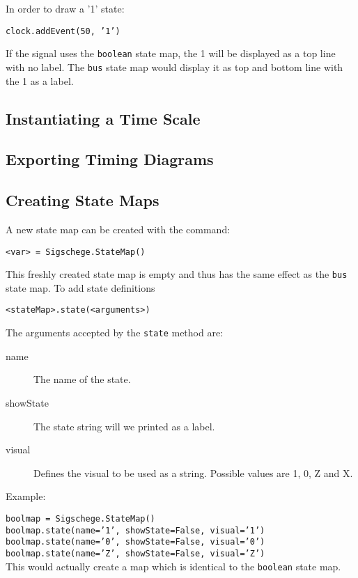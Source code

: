 \documentclass[11pt]{article}
\begin{document}
In order to draw a '1' state:

\texttt{clock.addEvent(50, '1')}

If the signal uses the \texttt{boolean} state map, the 1 will be displayed as a
top line with no label. The \texttt{bus} state map would display it as top and
bottom line with the 1 as a label.


\subsection{Instantiating a Time Scale}
\label{sec:tis}



\subsection{Exporting Timing Diagrams}
\label{sec:exp}

\subsection{Creating State Maps}
\label{sec:tis}

A new state map can be created with the command:

\begin{center}
  \texttt{<var> = Sigschege.StateMap()}
\end{center}

This freshly created state map is empty and thus has the same effect as the
\texttt{bus} state map. To add state definitions

\begin{center}
  \texttt{<stateMap>.state(<arguments>)}
\end{center}

The arguments accepted by the \texttt{state} method are:

\begin{description}
\item[name] The name of the state.
\item[showState] The state string will we printed as a label.
\item[visual] Defines the visual to be used as a string. Possible values are 1, 0, Z and X.
\end{description}

Example:

\texttt{boolmap = Sigschege.StateMap()}\\
\texttt{boolmap.state(name='1', showState=False, visual='1')}\\
\texttt{boolmap.state(name='0', showState=False, visual='0')}\\
\texttt{boolmap.state(name='Z', showState=False, visual='Z')}\\

This would actually create a map which is identical to the \texttt{boolean}
state map.
\end{document}
